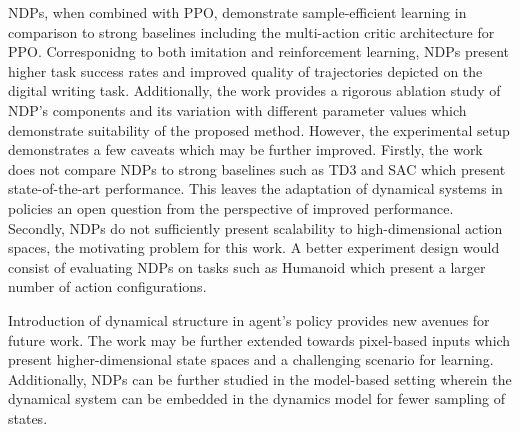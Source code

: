 \documentclass[11pt,letterpaper]{article}
\begin{document}
NDPs, when combined with PPO, demonstrate sample-efficient learning in comparison to strong baselines including the multi-action critic architecture for PPO. Corresponidng to both imitation and reinforcement learning, NDPs present higher task success rates and improved quality of trajectories depicted on the digital writing task. Additionally, the work provides a rigorous ablation study of NDP's components and its variation with different parameter values which demonstrate suitability of the proposed method. However, the experimental setup demonstrates a few caveats which may be further improved. Firstly, the work does not compare NDPs to strong baselines such as TD3 and SAC which present state-of-the-art performance. This leaves the adaptation of dynamical systems in policies an open question from the perspective of improved performance. Secondly, NDPs do not sufficiently present scalability to high-dimensional action spaces, the motivating problem for this work. A better experiment design would consist of evaluating NDPs on tasks such as Humanoid which present a larger number of action configurations. 

Introduction of dynamical structure in agent's policy provides new avenues for future work. The work may be further extended towards pixel-based inputs which present higher-dimensional state spaces and a challenging scenario for learning. Additionally, NDPs can be further studied in the model-based setting wherein the dynamical system can be embedded in the dynamics model for fewer sampling of states. 
\end{document}
